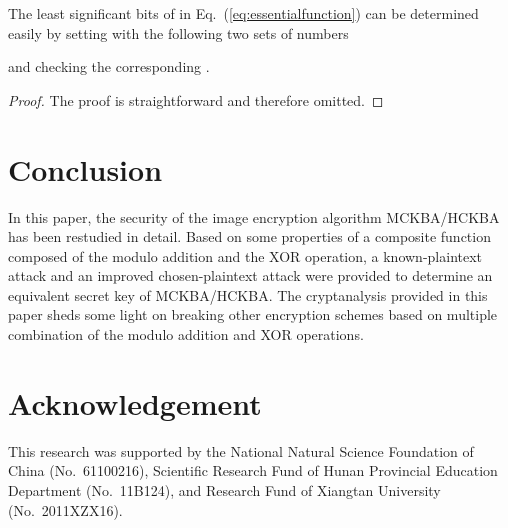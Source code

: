 \documentclass{ws-ijbc}
\begin{document}
\begin{corollary}
The  least significant bits of  in Eq.~(\ref{eq:essentialfunction}) can be determined easily
by setting  with the following two sets of numbers
\label{coro:msb}

and checking the corresponding .
\end{corollary}
\begin{proof}
The proof is straightforward and therefore omitted.
\end{proof}

\section{Conclusion}

In this paper, the security of the image encryption algorithm MCKBA/HCKBA has been restudied
in detail. Based on some properties of a composite function composed of the modulo addition
and the XOR operation, a known-plaintext attack and an improved chosen-plaintext attack were provided
to determine an equivalent secret key of MCKBA/HCKBA. The cryptanalysis provided in
this paper sheds some light on breaking other encryption schemes based on multiple combination
of the modulo addition and XOR operations.

\section*{Acknowledgement}

This research was supported by the National Natural Science Foundation of China (No.~61100216), Scientific Research Fund of Hunan Provincial Education Department (No.~11B124), and Research Fund of Xiangtan University (No.~2011XZX16).



\end{document}
